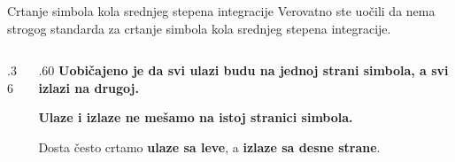 \begin{frame}[t,label=03-s021b]{Crtanje simbola kola srednjeg stepena integracije}
\setlength{\parskip}{0pt}
Verovatno ste uočili da nema strogog standarda za crtanje simbola
kola srednjeg stepena integracije.
\par\vspace{3mm}
\begin{columns}[c,onlytextwidth]
\begin{column}{.36\textwidth}\centering
{}
\par\vspace{1mm}

\end{column}
\begin{column}{.60\textwidth}
\textcolor{DEisticanje}{\textbf{Uobičajeno je da svi ulazi budu na jednoj strani
simbola, a svi izlazi na drugoj.}}
\par\vspace{3mm}
\textbf{Ulaze i izlaze ne mešamo na istoj stranici simbola.}
\par\vspace{3mm}
Dosta često crtamo \textbf{ulaze sa leve}, a \textbf{izlaze sa desne strane}.
\end{column}
\end{columns}
\end{frame}

